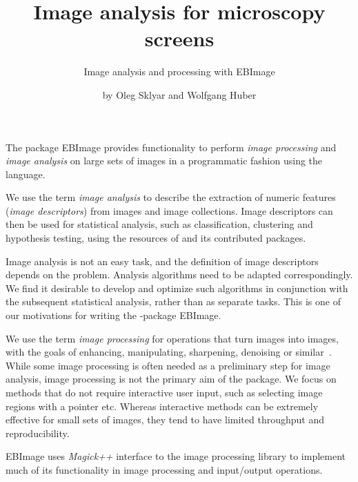 
\newcommand{\lib}[1]{{\mbox{\normalfont\textsf{#1}}}}
\newcommand{\Rfunction}[1]{{\mbox{\normalfont\texttt{#1}}}}
\newcommand{\Robject}[1]{{\mbox{\normalfont\texttt{#1}}}}
\newcommand{\Rpackage}[1]{{\mbox{\normalfont\textsf{#1}}}}
\newcommand{\Rclass}[1]{{\mbox{\normalfont\textit{#1}}}}

\title{Image analysis for microscopy screens}
\subtitle{Image analysis and processing with \Rpackage{EBImage}}
\author{by Oleg Sklyar and Wolfgang Huber}

\maketitle

The package \Rpackage{EBImage} provides functionality to perform {\em image processing} and {\em image analysis} on large sets of images in a programmatic fashion using the \R{} language.

We use the term {\em image analysis} to describe the extraction of numeric features ({\em image descriptors}) from images and image collections. Image descriptors can then be used for statistical analysis, such as classification, clustering and hypothesis testing, using the resources of \R{} and its contributed packages.

Image analysis is not an easy task, and the definition of image descriptors depends on the problem. Analysis algorithms need to be adapted correspondingly. We find it desirable to develop and optimize such algorithms in conjunction with the subsequent statistical analysis, rather than as separate tasks. This is one of our motivations for writing the \R{}-package \Rpackage{EBImage}.

We use the term {\em image processing} for operations that turn images into images, with the goals of enhancing, manipulating, sharpening, denoising or similar~\citep{R:Russ:2002}. While some image processing is often needed as a preliminary step for image analysis, image processing is not the primary aim of the package. We focus on methods that do not require interactive user input, such as selecting image regions with a pointer etc. Whereas interactive methods can be extremely effective for small sets of images, they tend to have limited throughput and reproducibility.

\Rpackage{EBImage} uses \Rclass{Magick++} interface to the \lib{\cite{R:ImageMagick:2006}} image processing library to implement much of its functionality in image processing and input/output operations.

